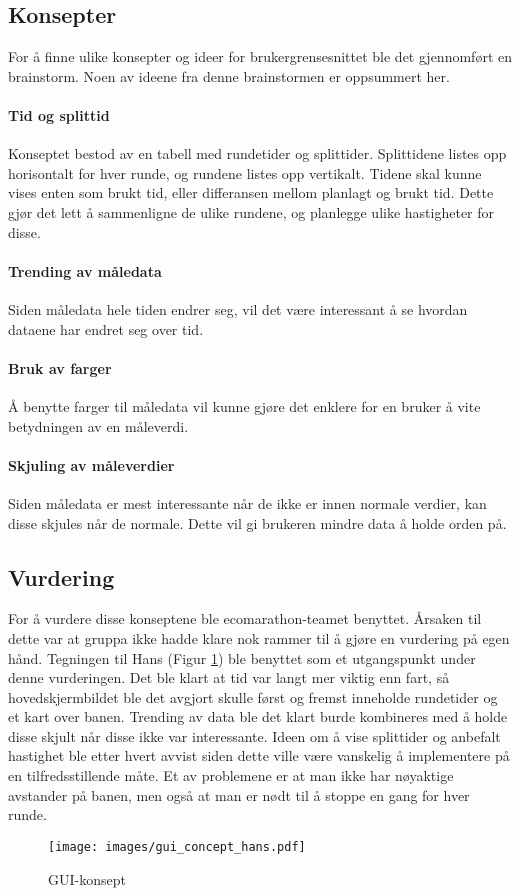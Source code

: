 \subsection{Konsepter}
For å finne ulike konsepter og ideer for brukergrensesnittet ble det gjennomført en brainstorm.
Noen av ideene fra denne brainstormen er oppsummert her.

\paragraph{Tid og splittid}
Konseptet bestod av en tabell med rundetider og splittider.
Splittidene listes opp horisontalt for hver runde, og rundene listes opp vertikalt.
Tidene skal kunne vises enten som brukt tid, eller differansen mellom planlagt og brukt tid.
Dette gjør det lett å sammenligne de ulike rundene, og planlegge ulike hastigheter for disse.

\paragraph{Trending av måledata}
Siden måledata hele tiden endrer seg, vil det være interessant å se hvordan dataene har endret seg over tid.

\paragraph{Bruk av farger}
Å benytte farger til måledata vil kunne gjøre det enklere for en bruker å vite betydningen av en måleverdi.

\paragraph{Skjuling av måleverdier}
Siden måledata er mest interessante når de ikke er innen normale verdier, kan disse skjules når de normale.
Dette vil gi brukeren mindre data å holde orden på.

\subsection{Vurdering}
For å vurdere disse konseptene ble ecomarathon-teamet benyttet.
Årsaken til dette var at gruppa ikke hadde klare nok rammer til å gjøre en vurdering på egen hånd.
Tegningen til Hans (Figur \ref{gui-concept}) ble benyttet som et utgangspunkt under denne vurderingen.
Det ble klart at tid var langt mer viktig enn fart, så hovedskjermbildet ble det avgjort skulle først og fremst inneholde rundetider og et kart over banen. 
Trending av data ble det klart burde kombineres med å holde disse skjult når disse ikke var interessante.
Ideen om å vise splittider og anbefalt hastighet ble etter hvert avvist siden dette ville være vanskelig å implementere på en tilfredsstillende måte.
Et av problemene er at man ikke har nøyaktige avstander på banen, men også at man er nødt til å stoppe en gang for hver runde.

\begin{figure}[H]
\texttt{[image: images/gui\_concept\_hans.pdf]}
\caption{GUI-konsept} 
\label{gui-concept}
\end{figure}
